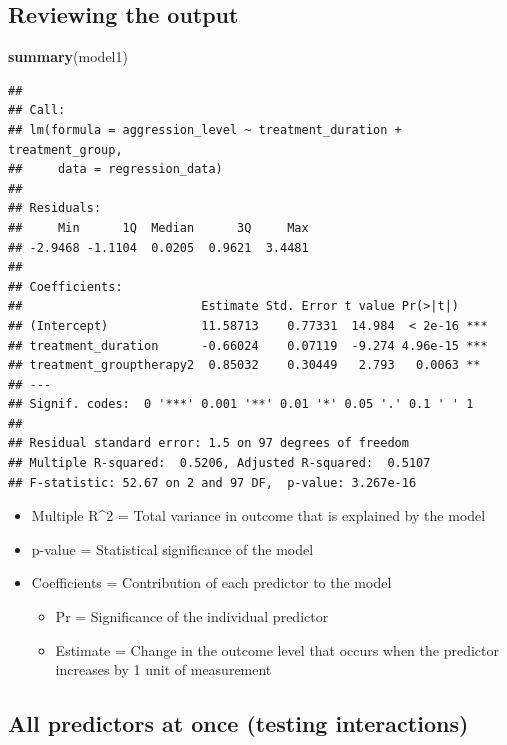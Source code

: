 \documentclass[
]{book}
\newenvironment{Shaded}{\begin{snugshade}}{\end{snugshade}}
\newcommand{\KeywordTok}[1]{\textcolor[rgb]{0.13,0.29,0.53}{\textbf{#1}}}
\newcommand{\NormalTok}[1]{#1}
\providecommand{\tightlist}{%
  \setlength{\itemsep}{0pt}\setlength{\parskip}{0pt}}
\begin{document}
\hypertarget{reviewing-the-output}{%
\subsection{Reviewing the output}\label{reviewing-the-output}}

\begin{Shaded}
\begin{Highlighting}[]
\KeywordTok{summary}\NormalTok{(model1)}
\end{Highlighting}
\end{Shaded}

\begin{verbatim}
## 
## Call:
## lm(formula = aggression_level ~ treatment_duration + treatment_group, 
##     data = regression_data)
## 
## Residuals:
##     Min      1Q  Median      3Q     Max 
## -2.9468 -1.1104  0.0205  0.9621  3.4481 
## 
## Coefficients:
##                         Estimate Std. Error t value Pr(>|t|)    
## (Intercept)             11.58713    0.77331  14.984  < 2e-16 ***
## treatment_duration      -0.66024    0.07119  -9.274 4.96e-15 ***
## treatment_grouptherapy2  0.85032    0.30449   2.793   0.0063 ** 
## ---
## Signif. codes:  0 '***' 0.001 '**' 0.01 '*' 0.05 '.' 0.1 ' ' 1
## 
## Residual standard error: 1.5 on 97 degrees of freedom
## Multiple R-squared:  0.5206, Adjusted R-squared:  0.5107 
## F-statistic: 52.67 on 2 and 97 DF,  p-value: 3.267e-16
\end{verbatim}

\begin{itemize}
\tightlist
\item
  Multiple R\^{}2 = Total variance in outcome that is explained by the model
\item
  p-value = Statistical significance of the model
\item
  Coefficients = Contribution of each predictor to the model

  \begin{itemize}
  \tightlist
  \item
    Pr = Significance of the individual predictor
  \item
    Estimate = Change in the outcome level that occurs when the predictor increases by 1 unit of measurement
  \end{itemize}
\end{itemize}

\hypertarget{all-predictors-at-once-testing-interactions}{%
\subsection{All predictors at once (testing interactions)}\label{all-predictors-at-once-testing-interactions}}
\end{document}
